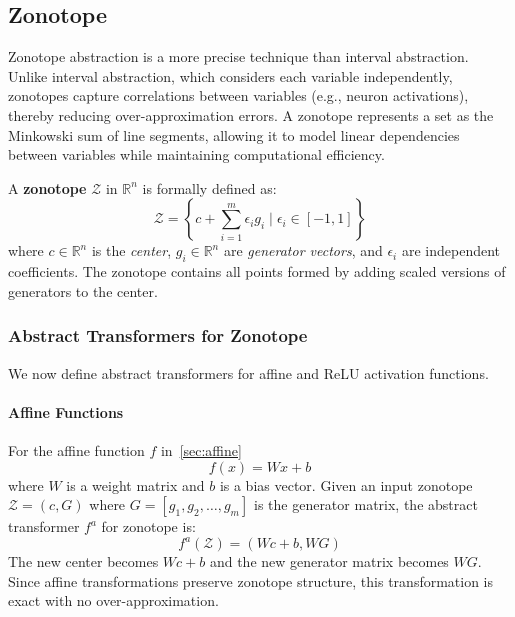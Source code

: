\documentclass[oneside,11pt,dvipsnames]{book}
\numberwithin{equation}{section}
\theoremstyle{definition}
\theoremstyle{remark}
\begin{document}
\subsection{Zonotope}\label{sec:zonotope-abstraction}

Zonotope abstraction is a more precise technique than interval abstraction. Unlike interval abstraction, which considers each variable independently, zonotopes capture correlations between variables (e.g., neuron activations), thereby reducing over-approximation errors. A zonotope represents a set as the Minkowski sum of line segments, allowing it to model linear dependencies between variables while maintaining computational efficiency.

A \textbf{zonotope} \(\mathcal{Z}\) in \(\mathbb{R}^n\) is formally defined as:
\[
\mathcal{Z} = \left\{c + \sum_{i=1}^{m} \epsilon_i g_i \mid \epsilon_i \in [-1, 1]\right\}
\]
where \(c \in \mathbb{R}^n\) is the \textit{center}, \(g_i \in \mathbb{R}^n\) are \textit{generator vectors}, and \(\epsilon_i\) are independent coefficients. The zonotope contains all points formed by adding scaled versions of generators to the center.

\subsubsection{Abstract Transformers for Zonotope}

We now define abstract transformers for affine and ReLU activation functions.

\paragraph{Affine Functions} For the affine function \(f\) in~\autoref{sec:affine}
\[f(x) = Wx + b\]
where \(W\) is a weight matrix and \(b\) is a bias vector. Given an input zonotope \(\mathcal{Z} = (c, G)\) where \(G = [g_1, g_2, \ldots, g_m]\) is the generator matrix, the abstract transformer \(f^a\) for zonotope is:
\[
f^a(\mathcal{Z}) = (Wc + b, WG)
\]
The new center becomes \(Wc + b\) and the new generator matrix becomes \(WG\). Since affine transformations preserve zonotope structure, this transformation is exact with no over-approximation.
\end{document}
